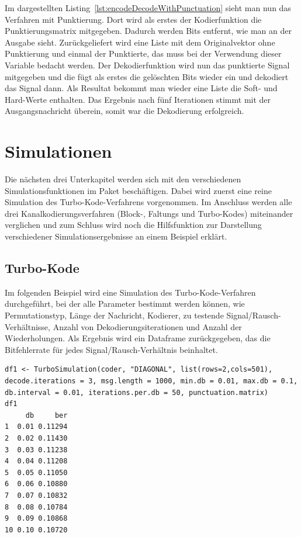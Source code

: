 Im dargestellten Listing~\ref{lst:encodeDecodeWithPunctuation} sieht man nun das Verfahren mit Punktierung. Dort wird als erstes der Kodierfunktion die Punktierungsmatrix mitgegeben. Dadurch werden Bits entfernt, wie man an der Ausgabe sieht. Zurückgeliefert wird eine Liste mit dem Originalvektor ohne Punktierung und einmal der Punktierte, das muss bei der Verwendung dieser Variable bedacht werden. Der Dekodierfunktion wird nun das punktierte Signal mitgegeben und die fügt als erstes die gelöschten Bits wieder ein und dekodiert das Signal dann. Als Resultat bekommt man wieder eine Liste die Soft- und Hard-Werte enthalten. Das Ergebnis nach fünf Iterationen stimmt mit der Ausgangsnachricht überein, somit war die Dekodierung erfolgreich.

\FloatBarrier
\section{Simulationen}
\label{sec:example_simulations}

Die nächsten drei Unterkapitel werden sich mit den verschiedenen Simulationsfunktionen im Paket beschäftigen. Dabei wird zuerst eine reine Simulation des Turbo-Kode-Verfahrens vorgenommen. Im Anschluss werden alle drei Kanalkodierungsverfahren (Block-, Faltungs und Turbo-Kodes) miteinander verglichen und zum Schluss wird noch die Hilfsfunktion zur Darstellung verschiedener Simulationsergebnisse an einem Beispiel erklärt.

\subsection{Turbo-Kode}
\label{sec:example_simulations_turbo}

Im folgenden Beispiel wird eine Simulation des Turbo-Kode-Verfahren durchgeführt, bei der alle Parameter bestimmt werden können, wie Permutationstyp, Länge der Nachricht, Kodierer, zu testende Signal/Rausch-Verhältnisse, Anzahl von Dekodierungsiterationen und Anzahl der Wiederholungen. Als Ergebnis wird ein Dataframe zurückgegeben, das die Bitfehlerrate für jedes Signal/Rausch-Verhältnis beinhaltet.

\begin{lstlisting}[caption=Turbo-Kode-Simulation, label={lst:turboCodeSimulation}, float=!th]
df1 <- TurboSimulation(coder, "DIAGONAL", list(rows=2,cols=501), decode.iterations = 3, msg.length = 1000, min.db = 0.01, max.db = 0.1, db.interval = 0.01, iterations.per.db = 50, punctuation.matrix)
df1
     db     ber
1  0.01 0.11294
2  0.02 0.11430
3  0.03 0.11238
4  0.04 0.11208
5  0.05 0.11050
6  0.06 0.10880
7  0.07 0.10832
8  0.08 0.10784
9  0.09 0.10868
10 0.10 0.10720
\end{lstlisting}

